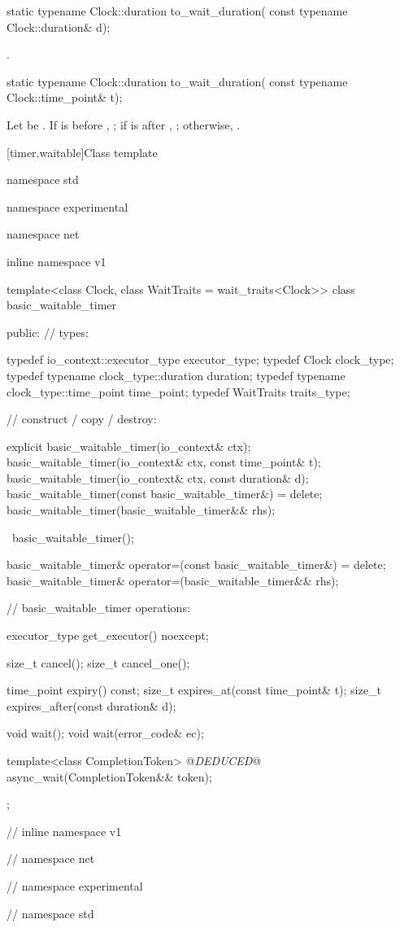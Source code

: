 \begin{itemdecl}
static typename Clock::duration to_wait_duration(
  const typename Clock::duration& d);
\end{itemdecl}

\begin{itemdescr}
\pnum
\returns {}.
\end{itemdescr}

\begin{itemdecl}
static typename Clock::duration to_wait_duration(
  const typename Clock::time_point& t);
\end{itemdecl}

\begin{itemdescr}
\pnum
\returns Let  be . If  is before , ; if  is after , ; otherwise, .
\end{itemdescr}



[timer.waitable]{Class template }

\begin{codeblock}
namespace std {
namespace experimental {
namespace net {
inline namespace v1 {

  template<class Clock, class WaitTraits = wait_traits<Clock>>
  class basic_waitable_timer
  {
  public:
    // types:

    typedef io_context::executor_type executor_type;
    typedef Clock clock_type;
    typedef typename clock_type::duration duration;
    typedef typename clock_type::time_point time_point;
    typedef WaitTraits traits_type;

    // construct / copy / destroy:

    explicit basic_waitable_timer(io_context& ctx);
    basic_waitable_timer(io_context& ctx, const time_point& t);
    basic_waitable_timer(io_context& ctx, const duration& d);
    basic_waitable_timer(const basic_waitable_timer&) = delete;
    basic_waitable_timer(basic_waitable_timer&& rhs);

    ~basic_waitable_timer();

    basic_waitable_timer& operator=(const basic_waitable_timer&) = delete;
    basic_waitable_timer& operator=(basic_waitable_timer&& rhs);

    // basic_waitable_timer operations:

    executor_type get_executor() noexcept;

    size_t cancel();
    size_t cancel_one();

    time_point expiry() const;
    size_t expires_at(const time_point& t);
    size_t expires_after(const duration& d);

    void wait();
    void wait(error_code& ec);

    template<class CompletionToken>
      @\textit{DEDUCED}@ async_wait(CompletionToken&& token);
  };

} // inline namespace v1
} // namespace net
} // namespace experimental
} // namespace std
\end{codeblock}

